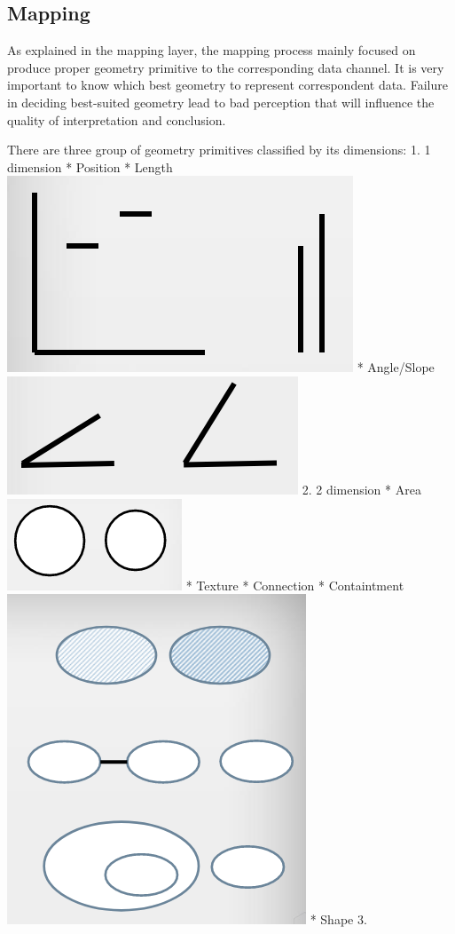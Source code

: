 \documentclass[11pt]{article}
\makeatletter
\def\maxwidth{\ifdim\Gin@nat@width>\linewidth\linewidth
    \else\Gin@nat@width\fi}
\let\Oldincludegraphics\includegraphics
\renewcommand{\includegraphics}[1]{\Oldincludegraphics[width=.8\maxwidth]{#1}}
\makeatother
\begin{document}
    \subsection{Mapping}\label{mapping}

As explained in the mapping layer, the mapping process mainly focused on
produce proper geometry primitive to the corresponding data channel. It
is very important to know which best geometry to represent correspondent
data. Failure in deciding best-suited geometry lead to bad perception
that will influence the quality of interpretation and conclusion.

There are three group of geometry primitives classified by its
dimensions: 1. 1 dimension * Position * Length
\includegraphics{images/position-length.png} * Angle/Slope
\includegraphics{images/angle.png} 2. 2 dimension * Area
\includegraphics{images/area.png} * Texture * Connection * Containtment
\includegraphics{images/texture-connection-containtment.png} * Shape 3.
\end{document}
